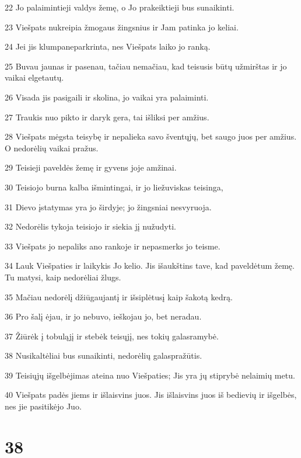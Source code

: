 \par 22 Jo palaimintieji valdys žemę, o Jo prakeiktieji bus sunaikinti. 
\par 23 Viešpats nukreipia žmogaus žingsnius ir Jam patinka jo keliai. 
\par 24 Jei jis klumpa­neparkrinta, nes Viešpats laiko jo ranką. 
\par 25 Buvau jaunas ir pasenau, tačiau nemačiau, kad teisusis būtų užmirštas ir jo vaikai elgetautų. 
\par 26 Visada jis pasigaili ir skolina, jo vaikai yra palaiminti. 
\par 27 Traukis nuo pikto ir daryk gera, tai išliksi per amžius. 
\par 28 Viešpats mėgsta teisybę ir nepalieka savo šventųjų, bet saugo juos per amžius. O nedorėlių vaikai pražus. 
\par 29 Teisieji paveldės žemę ir gyvens joje amžinai. 
\par 30 Teisiojo burna kalba išmintingai, ir jo liežuvis­kas teisinga, 
\par 31 Dievo įstatymas yra jo širdyje; jo žingsniai nesvyruoja. 
\par 32 Nedorėlis tykoja teisiojo ir siekia jį nužudyti. 
\par 33 Viešpats jo nepaliks ano rankoje ir nepasmerks jo teisme. 
\par 34 Lauk Viešpaties ir laikykis Jo kelio. Jis išaukštins tave, kad paveldėtum žemę. Tu matysi, kaip nedorėliai žlugs. 
\par 35 Mačiau nedorėlį džiūgaujantį ir išsiplėtusį kaip šakotą kedrą. 
\par 36 Pro šalį ėjau, ir jo nebuvo, ieškojau jo, bet neradau. 
\par 37 Žiūrėk į tobuląjį ir stebėk teisųjį, nes tokių galas­ramybė. 
\par 38 Nusikaltėliai bus sunaikinti, nedorėlių galas­pražūtis. 
\par 39 Teisiųjų išgelbėjimas ateina nuo Viešpaties; Jis yra jų stiprybė nelaimių metu. 
\par 40 Viešpats padės jiems ir išlaisvins juos. Jis išlaisvins juos iš bedievių ir išgelbės, nes jie pasitikėjo Juo.



\chapter{38}


